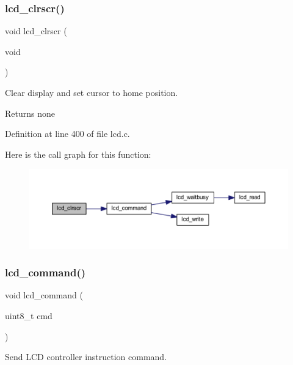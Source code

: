 \subsubsection{\texorpdfstring{lcd\_clrscr()}{lcd\_clrscr()}}
{\footnotesize\ttfamily void lcd\+\_\+clrscr (\begin{DoxyParamCaption}\item[{void}]{ }\end{DoxyParamCaption})}



Clear display and set cursor to home position. 

\begin{DoxyReturn}{Returns}
none 
\end{DoxyReturn}


Definition at line 400 of file lcd.\+c.

Here is the call graph for this function\+:\nopagebreak
\begin{figure}[H]
\begin{center}
\leavevmode
\includegraphics[width=350pt]{group__pfleury__lcd_gaf8da853dba4b9d5f2aea4e294444e14d_cgraph}
\end{center}
\end{figure}
\mbox{\label{group__pfleury__lcd_gaea9d14f02df06f948cb5a56776980826}} 
\subsubsection{\texorpdfstring{lcd\_command()}{lcd\_command()}}
{\footnotesize\ttfamily void lcd\+\_\+command (\begin{DoxyParamCaption}\item[{uint8\+\_\+t}]{cmd }\end{DoxyParamCaption})}



Send L\+CD controller instruction command. 


